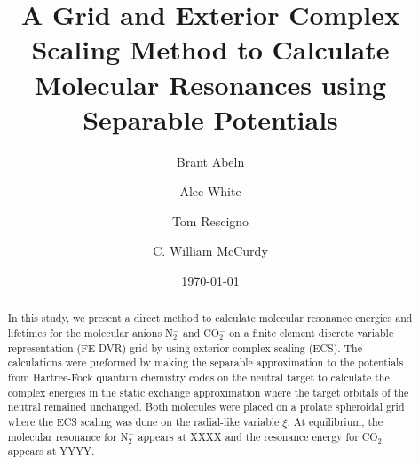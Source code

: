 \documentclass[preprint]{revtex4-1}
\begin{document}
\title{A Grid and Exterior Complex Scaling Method to Calculate Molecular Resonances using Separable Potentials}
\date{\today}

\author{Brant Abeln}
\author{Alec White}
\author{Tom Rescigno}
\author{C. William McCurdy}
\maketitle

\begin{abstract}
In this study, we present a direct method to calculate molecular resonance energies and lifetimes for the molecular anions N$^{-}_2$ and CO$_2^{-}$ on a finite element discrete variable representation (FE-DVR) grid by using exterior complex scaling (ECS).
The calculations were preformed by making the separable approximation to the potentials from Hartree-Fock quantum chemistry codes on the neutral target to calculate the complex energies in the static exchange approximation where the target orbitals of the neutral remained unchanged.
Both molecules were placed on a prolate spheroidal grid where the ECS scaling was done on the radial-like variable $\xi$.
At equilibrium, the molecular resonance for N$_2^{-}$ appears at XXXX and the resonance energy for CO$_2$ appears at YYYY.
\end{abstract}
\end{document}

